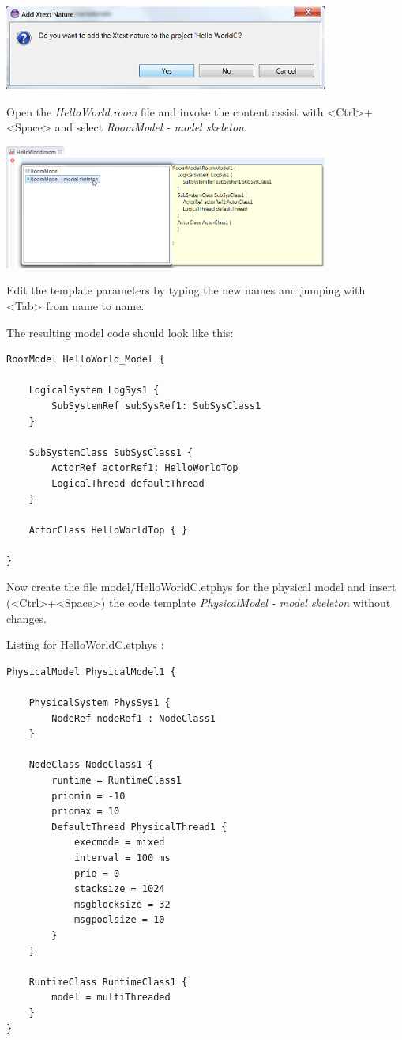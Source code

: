 \includegraphics[width=0.8\textwidth]{images/016-HelloWorldC04.png}

Open the \emph{HelloWorld.room} file and invoke the content assist with <Ctrl>+<Space> and select \emph{RoomModel - model skeleton}.

\includegraphics[width=0.8\textwidth]{images/016-HelloWorldC041.png}

Edit the template parameters by typing the new names and jumping with <Tab> from name to name.

The resulting model code should look like this:

\begin{lstlisting}[language=ROOM]
RoomModel HelloWorld_Model {

	LogicalSystem LogSys1 {
		SubSystemRef subSysRef1: SubSysClass1
	}

	SubSystemClass SubSysClass1 {
		ActorRef actorRef1: HelloWorldTop
		LogicalThread defaultThread
	}

	ActorClass HelloWorldTop { }

}
\end{lstlisting}

Now create the file model/HelloWorldC.etphys for the physical model and insert (<Ctrl>+<Space>) the code template \emph{PhysicalModel - model skeleton} without changes.

Listing for HelloWorldC.etphys :

\begin{lstlisting}[language=etPhys]
PhysicalModel PhysicalModel1 {

	PhysicalSystem PhysSys1 {
		NodeRef nodeRef1 : NodeClass1
	}

	NodeClass NodeClass1 {
		runtime = RuntimeClass1
		priomin = -10
		priomax = 10
		DefaultThread PhysicalThread1 {
			execmode = mixed
			interval = 100 ms
			prio = 0
			stacksize = 1024
			msgblocksize = 32
			msgpoolsize = 10
		}
	}

	RuntimeClass RuntimeClass1 {
		model = multiThreaded
	}
}
\end{lstlisting}

